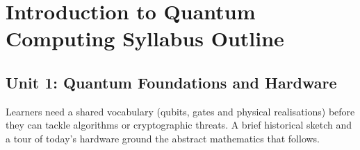 \section{Introduction to Quantum Computing Syllabus Outline}







\subsection{Unit 1: Quantum Foundations and Hardware}\label{sec:U1-outline}



Learners need a shared vocabulary (qubits, gates and physical realisations) before they can tackle algorithms or cryptographic threats. 
A brief historical sketch and a tour of today's hardware ground the abstract mathematics that follows.

